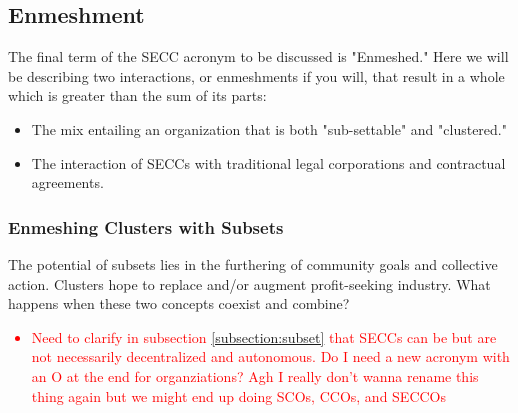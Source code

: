 \documentclass{article}[10pt]
\begin{document}











\subsection{Enmeshment}
\label{subsection:enmeshment}

The final term of the SECC acronym to be discussed is "Enmeshed." Here we will be describing two interactions, or enmeshments if you will, that result in a whole which is greater than the sum of its parts:
\begin{itemize}
    \item The mix entailing an organization that is both "sub-settable" and "clustered."
    \item The interaction of SECCs with traditional legal corporations and contractual agreements.
\end{itemize}

\subsubsection{Enmeshing Clusters with Subsets}
\label{subsubsection:enmeshment1}

The potential of subsets lies in the furthering of community goals and collective action.
Clusters hope to replace and/or augment profit-seeking industry.
What happens when these two concepts coexist and combine?\par
\textcolor{red}{\begin{itemize}
    \item Need to clarify in subsection \ref{subsection:subset} that SECCs can be but are not necessarily decentralized and autonomous.
    Do I need a new acronym with an O at the end for organziations?
    Agh I really don't wanna rename this thing again but we might end up doing SCOs, CCOs, and SECCOs
\end{itemize}}
\end{document}
